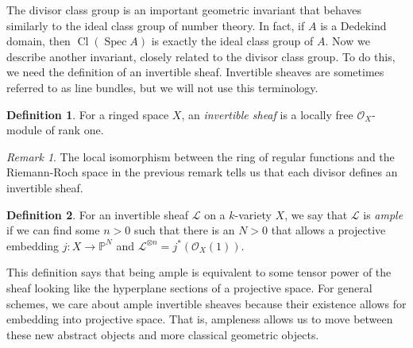 \documentclass[12pt,twoside]{reedthesis}
\theoremstyle{plain}
\theoremstyle{definition}
\newtheorem{definition}{Definition}[section]
\theoremstyle{remark}
\newtheorem{remark}{Remark}[section]
\newcommand{\Proj}{\mathbb{P}}
\newcommand{\calO}{\mathcal{O}}
\newcommand{\Cl}{\operatorname{Cl}}
\newcommand{\Spec}{\operatorname{Spec}}
\begin{document}
The divisor class group is an important geometric invariant that behaves similarly to the ideal class group of number theory. In fact, if $A$ is a Dedekind domain, then $\Cl(\Spec A)$ is exactly the ideal class group of $A$. Now we describe another invariant, closely related to the divisor class group. To do this, we need the definition of an invertible sheaf. Invertible sheaves are sometimes referred to as line bundles, but we will not use this terminology.
\begin{definition}
For a ringed space $X$, an \emph{invertible sheaf} is a locally free $\calO_X$-module of rank one.
\end{definition}
\begin{remark}
The local isomorphism between the ring of regular functions and the Riemann-Roch space in the previous remark tells us that each divisor defines an invertible sheaf.
\end{remark}
\begin{definition}\label{ampleDef}
For an invertible sheaf $\mathcal{L}$ on a $k$-variety $X$, we say that $\mathcal{L}$ is \emph{ample} if we can find some $n>0$ such that there is an $N>0$ that allows a projective embedding $j:X\to\Proj^N$ and $\mathcal{L}^{\otimes n}=j^*(\calO_X(1))$.
\end{definition}
\noindent This definition says that being ample is equivalent to some tensor power of the sheaf looking like the hyperplane sections of a projective space. For general schemes, we care about ample invertible sheaves because their existence allows for embedding into projective space. That is, ampleness allows us to move between these new abstract objects and more classical geometric objects.
\end{document}
